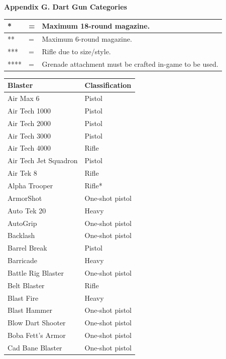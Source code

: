 \begin{table}
\end{table}

\textbf{Appendix G. Dart Gun Categories}

\begin{table}
\begin{tabular}{|l|l|l|} \hline 
* & = & Maximum 18-round magazine. \\
 \hline ** & = & Maximum 6-round magazine. \\
 \hline *** & = & Rifle due to size/style. \\
 \hline **** & = & Grenade attachment must be crafted in-game to be used. \\
 \hline \end{tabular}

\end{table}

\begin{table}
\begin{tabular}{|l|l|} \hline 
Blaster & Classification \\
 \hline Air Max 6 & Pistol \\
 \hline Air Tech 1000 & Pistol \\
 \hline Air Tech 2000 & Pistol \\
 \hline Air Tech 3000 & Pistol \\
 \hline Air Tech 4000 & Rifle \\
 \hline Air Tech Jet Squadron & Pistol \\
 \hline Air Tek 8 & Rifle \\
 \hline Alpha Trooper & Rifle* \\
 \hline ArmorShot & One-shot pistol \\
 \hline Auto Tek 20 & Heavy \\
 \hline AutoGrip & One-shot pistol \\
 \hline Backlash & One-shot pistol \\
 \hline Barrel Break & Pistol \\
 \hline Barricade & Heavy \\
 \hline Battle Rig Blaster & One-shot pistol \\
 \hline Belt Blaster & Rifle \\
 \hline Blast Fire & Heavy \\
 \hline Blast Hammer & One-shot pistol \\
 \hline Blow Dart Shooter & One-shot pistol \\
 \hline Boba Fett's Armor & One-shot pistol \\
 \hline Cad Bane Blaster & One-shot pistol \\

\end{tabular}
\end{table}
